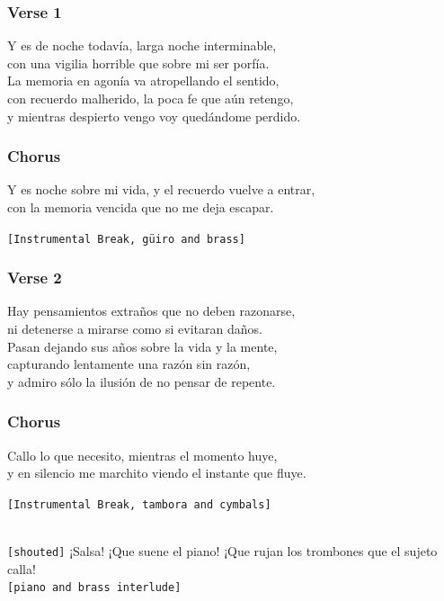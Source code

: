 \documentclass[]{article}
\begin{document}
\subsubsection{Verse 1}\label{verse-1-21}

Y es de noche todavía, larga noche interminable,\\
con una vigilia horrible que sobre mi ser porfía.\\
La memoria en agonía va atropellando el sentido,\\
con recuerdo malherido, la poca fe que aún retengo,\\
y mientras despierto vengo voy quedándome perdido.

\subsubsection{Chorus}\label{chorus-55}

Y es noche sobre mi vida, y el recuerdo vuelve a entrar,\\
con la memoria vencida que no me deja escapar.

\texttt{{[}Instrumental\ Break,\ güiro\ and\ brass{]}}

\subsubsection{Verse 2}\label{verse-2-18}

Hay pensamientos extraños que no deben razonarse,\\
ni detenerse a mirarse como si evitaran daños.\\
Pasan dejando sus años sobre la vida y la mente,\\
capturando lentamente una razón sin razón,\\
y admiro sólo la ilusión de no pensar de repente.

\subsubsection{Chorus}\label{chorus-56}

Callo lo que necesito, mientras el momento huye,\\
y en silencio me marchito viendo el instante que fluye.

\texttt{{[}Instrumental\ Break,\ tambora\ and\ cymbals{]}}\strut \\
\texttt{{[}shouted{]}} ¡Salsa! ¡Que suene el piano! ¡Que rujan los
trombones que el sujeto calla!\\
\texttt{{[}piano\ and\ brass\ interlude{]}}
\end{document}
